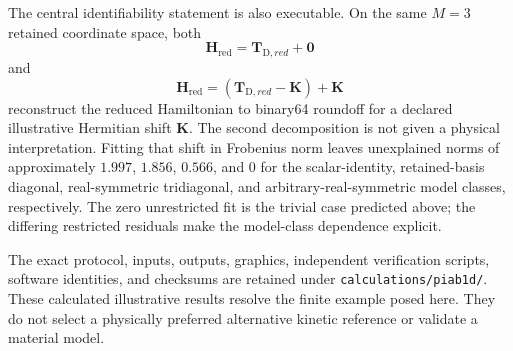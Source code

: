 The central identifiability statement is also executable. On the same $M=3$
retained coordinate space, both
\begin{equation}
    \mathbf H_{\mathrm{red}}
    =
    \mathbf T_{\mathrm D,red}+\mathbf 0
\end{equation}
and
\begin{equation}
    \mathbf H_{\mathrm{red}}
    =
    (\mathbf T_{\mathrm D,red}-\mathbf K)+\mathbf K
\end{equation}
reconstruct the reduced Hamiltonian to binary64 roundoff for a declared
illustrative Hermitian shift $\mathbf K$. The second decomposition is not given
a physical interpretation. Fitting that shift in Frobenius norm leaves
unexplained norms of approximately $1.997$, $1.856$, $0.566$, and $0$ for the
scalar-identity, retained-basis diagonal, real-symmetric tridiagonal, and
arbitrary-real-symmetric model classes, respectively. The zero unrestricted fit
is the trivial case predicted above; the differing restricted residuals make
the model-class dependence explicit.

The exact protocol, inputs, outputs, graphics, independent verification scripts,
software identities, and checksums are retained under
\texttt{calculations/piab1d/}. These calculated
illustrative results resolve the finite example posed here. They do not select a
physically preferred alternative kinetic reference or validate a material
model.
